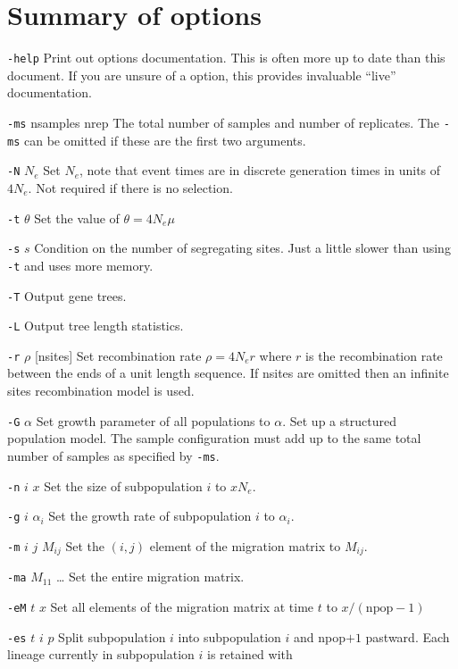 \documentclass{article}
\begin{document}
\section{Summary of options}
\begin{eqlist*}
\item[{\tt -help}] Print out options documentation. This
is often more up to date than this document. If you are unsure of a option, this
provides invaluable ``live'' documentation.
\item[{\tt -ms} nsamples nrep \quad] The total number of samples and number of
replicates. The {\tt -ms} can be omitted if these are the first two arguments.
\item[{\tt -N} $N_e$] Set $N_e$, note that event times are in
discrete generation times in units of $4N_e$. Not required if there is no
selection. 
\item[{\tt -t} $\theta$] Set the value of $\theta=4N_e\mu$
\item[{\tt -s} $s$] Condition on the number of segregating sites. Just a little
slower than using {\tt -t} and uses more memory.
\item[{\tt -T}] Output gene trees.
\item[{\tt -L}] Output tree length statistics. 
\item[{\tt -r} $\rho$ {[nsites]} ] Set recombination rate $\rho=4N_er$ where
$r$ is the recombination rate between the ends of a unit length sequence. If nsites
are omitted then an infinite sites recombination model is used.   
\item[{\tt -G} $\alpha$] Set growth parameter of all populations to $\alpha$. 
 Set up a structured population
model. The sample configuration must add up to the same total number of samples
as specified by {\tt -ms}.
\item[{\tt -n} $i$ $x$] Set the size of subpopulation $i$ to $xN_e$. 
\item[{\tt -g} $i$ $\alpha_i$] Set the growth rate of subpopulation $i$ to
$\alpha_i$.
\item[{\tt -m} $i$ $j$ $M_{ij}$] Set the $(i,j)$ element of the migration
matrix to $M_{ij}$.
\item[{\tt -ma} $M_{11}$ \ldots] Set the entire migration matrix.
\item[{\tt -eM} $t$ $x$] Set all elements of the migration matrix at time $t$
to $x/(\textrm{npop}-1)$
\item[{\tt -es} $t$ $i$ $p$] Split subpopulation $i$ into subpopulation $i$ and
npop$+1$ pastward. Each lineage currently in subpopulation $i$ is retained with

\end{eqlist*}
\end{document}
